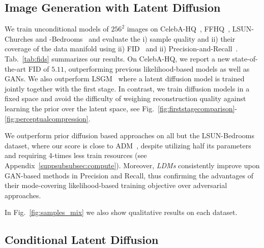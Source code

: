 \subsection{Image Generation with Latent Diffusion}

\label{subsec:uncond2img}

We train unconditional models of $256^2$ images on CelebA-HQ~\cite{DBLP:journals/corr/abs-1710-10196}, FFHQ~\cite{stylegan}, LSUN-Churches and \mbox{-Bedrooms}~\cite{DBLP:journals/corr/YuZSSX15} 
and evaluate the i) sample quality and ii) their coverage of the data manifold using ii) FID~\cite{FID} and ii) Precision-and-Recall~\cite{DBLP:journals/corr/abs-1904-06991}. Tab.~\ref{tab:fids} summarizes our results. On CelebA-HQ, we report a new state-of-the-art FID of $5.11$, outperforming previous likelihood-based models as well as GANs. We also outperform LSGM~\cite{DBLP:journals/corr/abs-2106-05931} where a latent diffusion model is trained jointly together with the first stage. In contrast, we train diffusion models in a fixed space and avoid the difficulty of weighing reconstruction quality against learning the prior over the latent space, see Fig.~\ref{fig:firststagecomparison}-\ref{fig:perceptualcompression}.

We outperform prior diffusion based approaches on all but the LSUN-Bedrooms dataset, where our score is close to ADM~\cite{DBLP:journals/corr/abs-2105-05233}, despite utilizing half its parameters and requiring 4-times less train resources (see Appendix~\ref{suppsubsubsec:compute}). 
Moreover, \emph{LDMs} consistently improve upon GAN-based methods in Precision and Recall, thus confirming the advantages of their mode-covering likelihood-based training objective over adversarial approaches.

In Fig.~\ref{fig:samples_mix} we also show qualitative results on each dataset.

\subsection{Conditional Latent Diffusion}
\label{subsec:conditionallatentdiffusion}

